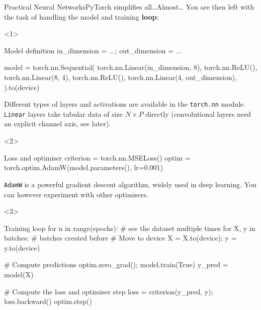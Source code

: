 \begin{frame}[fragile]{Practical Neural Networks}{PyTorch simplifies all\dots Almost\dots}
    You are then left with the task of handling the model and training \textbf{loop}:

    \vfill

    \begin{onlyenv}<1>
        \begin{codewithcard}{Model definition}
in_dimension = ...; out_dimension = ...

model = torch.nn.Sequential(
            torch.nn.Linear(in_dimension, 8),
            torch.nn.ReLU(),
            torch.nn.Linear(8, 4),
            torch.nn.ReLU(),
            torch.nn.Linear(4, out_dimension),
        ).to(device)
        \end{codewithcard}

        \vfill

        {\tiny Different types of layers and activations are available in the \texttt{torch.nn} module. \texttt{Linear} layers take tabular data of size $N \times P$ directly (convolutional layers need an explicit channel axis, see later).}
    \end{onlyenv}

    \begin{onlyenv}<2>
        \begin{codewithcard}{Loss and optimiser}
criterion = torch.nn.MSELoss()
optim = torch.optim.AdamW(model.parameters(), lr=0.001)
        \end{codewithcard}

        \vfill

        {\tiny \texttt{AdamW} is a powerful gradient descent algorithm, widely used in deep learning. You can however experiment with other optimisers.}
    \end{onlyenv}


    \begin{onlyenv}<3>
        \begin{codewithcard}{Training loop}
for n in range(epochs):  # see the dataset multiple times
    for X, y in batches:  # batches created before
            # Move to device
            X = X.to(device); y = y.to(device)

            # Compute predictions
            optim.zero_grad(); model.train(True)
            y_pred = model(X)

            # Compute the loss and optimiser step
            loss = criterion(y_pred, y); loss.backward()
            optim.step()
        \end{codewithcard}
    \end{onlyenv}
\end{frame}

